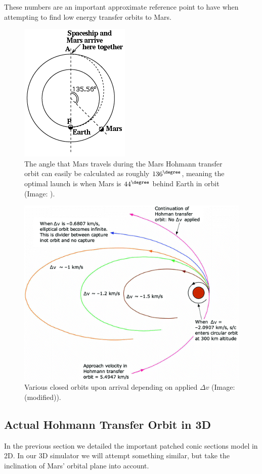 These numbers are an important approximate reference point to have when attempting to find low energy transfer orbits to Mars.

\begin{figure}[ht]
    \centering
    \includegraphics[width=0.35\linewidth]{fig/Hohmann-angle.png}
    \caption{The angle that Mars travels during the Mars Hohmann transfer orbit can easily be calculated as roughly \(136^\degree\), meaning the optimal launch is when Mars is \(44^\degree\) behind Earth in orbit (Image: \cite{Stern}).}
    \label{fig:Hohmann-angle}
\end{figure}

\begin{figure}[ht]
    \centering
    \includegraphics[width=0.85\linewidth]{fig/mars-arrival-orbit.png}
    \caption{Various closed orbits upon arrival depending on applied $\Delta v$ (Image: \cite[p.~137]{Rapp2016} (modified)).}
    \label{fig:mars-arrival-orbit}
\end{figure}

\clearpage

\subsection{Actual Hohmann Transfer Orbit in 3D}
In the previous section we detailed the important patched conic sections model in 2D. In our 3D simulator we will attempt something similar, but take the inclination of Mars' orbital plane into account.

